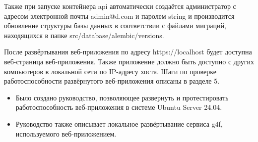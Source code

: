 Также при запуске контейнера api автоматически создаётся администратор с адресом электронной почты admin@d.com и паролем string и производится обновление структуры базы данных в соответствии с файлами миграций, находящихся в папке src/database/alembic/versions.


После развёртывания веб-приложения по адресу https://localhost будет доступна веб-страница веб-приложения. Также приложение должно быть доступно с других компьютеров в локальной сети по IP-адресу хоста. Шаги по проверке работоспособности развёрнутого веб-приложения описаны в разделе 5.


\begin{itemize}
    \item Было создано руководство, позволяющее развернуть и протестировать работоспособность веб-приложения в системе Ubuntu Server 24.04.
    \item Руководство также описывает локальное развёртывание сервиса g4f, используемого веб-приложением.
\end{itemize}
